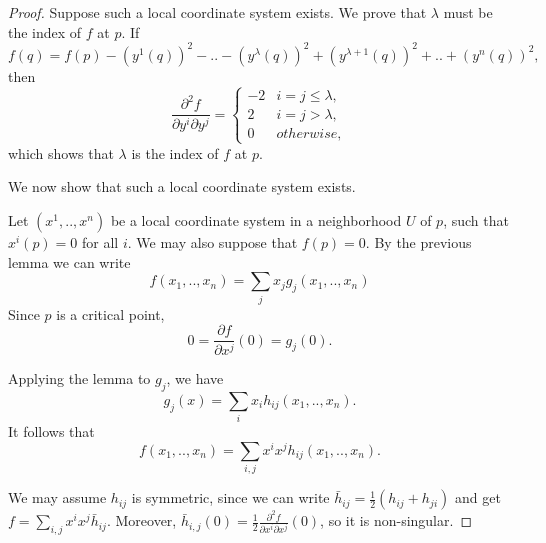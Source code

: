 \documentclass[a4paper,11pt,reqno]{amsart}
\begin{document}
\begin{proof}
  Suppose such a local coordinate system exists. We prove that $\lambda$ must be
  the index of $f$ at $p$. If
  \begin{equation}
        f(q) = f(p) - (y^1(q))^2 - .. - (y^\lambda(q))^2 + (y^{\lambda+1}(q))^2 + .. + (y^n(q))^2,
  \end{equation}
  then
  \begin{equation}
    \frac{\partial^2 f}{\partial y^i \partial y^j} = 
    \begin{cases}
      -2 & i = j \le \lambda, \\
      2  & i = j > \lambda, \\
      0  & otherwise,
    \end{cases}
  \end{equation}
  which shows that $\lambda$ is the index of $f$ at $p$.


  We now show that such a local coordinate system exists.

  
  Let $(x^1, .., x^n)$ be a local coordinate system in a neighborhood $U$ of
  $p$, such that $x^i(p) = 0$ for all $i$. We may also suppose that $f(p) = 0$.
  By the previous lemma we can write
  \begin{equation}
    f(x_1, .., x_n) = \sum_j x_jg_j(x_1, .., x_n)
  \end{equation}
  Since $p$ is a critical point, 
  \begin{equation}
    0 = \frac{\partial f}{\partial x^j}(0) = g_j(0).
  \end{equation}
  
  Applying the lemma to $g_j$, we have
  \begin{equation}
    g_j(x) = \sum_i x_ih_{ij}(x_1, .., x_n).
  \end{equation}
  It follows that
  \begin{equation}
    f(x_1, .., x_n) = \sum_{i,j} x^ix^jh_{ij}(x_1, .., x_n).
  \end{equation}
  
  We may assume $h_{ij}$ is symmetric, since we can write $\bar{h}_{ij} =
  \frac{1}{2}(h_{ij}+h_{ji})$ and get $f = \sum_{i,j}
  x^ix^j\bar{h}_{ij}$. Moreover, $\bar{h}_{i,j}(0) = \frac{1}{2}\frac{\partial^2
    f}{\partial x^i \partial x^j}(0)$, so it is non-singular.


\end{proof}
\end{document}
